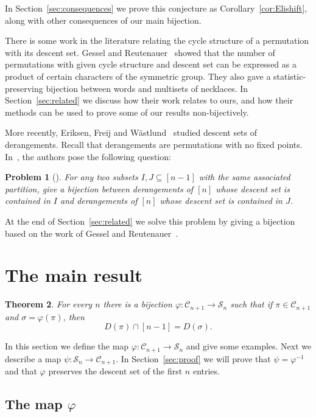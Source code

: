 \documentclass[11pt]{amsart}
\newtheorem{theorem}{Theorem}[section]
\newtheorem{prob}[theorem]{Problem}
\renewcommand\S{\mathcal S}
\newcommand\C{\mathcal C}
\newcommand\bij{\varphi}
\newcommand\inv{\psi}
\begin{document}
In Section~\ref{sec:consequences} we prove this conjecture as Corollary~\ref{cor:Elishift}, along with other consequences of our main bijection.

There is some work in the literature relating the cycle structure of a permutation with its descent set.
Gessel and Reutenauer~\cite{GR} showed that the number of permutations with given cycle structure and descent set can be expressed as a product of certain characters of the symmetric group.
They also gave a statistic-preserving bijection between words and multisets of necklaces. In Section~\ref{sec:related} we discuss how their work relates to ours, and how their methods can be used to prove some of our results non-bijectively.

More recently, Eriksen, Freij and W\"astlund~\cite{EFW} studied descent sets of derangements. Recall that derangements are permutations with no fixed points.
In~\cite[Problem~9.3]{EFW}, the authors pose the following question:

\begin{prob}[\cite{EFW}]\label{prob:EFW} For any two subsets $I,J\subseteq[n-1]$ with the same associated partition, give a bijection between derangements of $[n]$ whose descent
set is contained in $I$ and derangements of $[n]$ whose descent set is contained in $J$.
\end{prob}

At the end of Section~\ref{sec:related} we solve this problem by giving a bijection based on the work of Gessel and Reutenauer~\cite{GR}.

\section{The main result}\label{sec:main}

\begin{theorem}\label{thm:bij} For every $n$ there is a bijection $\bij:\C_{n+1}\rightarrow\S_n$ such that if $\pi\in\C_{n+1}$ and $\sigma=\bij(\pi)$, then
$$D(\pi)\cap[n-1]=D(\sigma).$$
\end{theorem}

In this section we define the map $\bij:\C_{n+1}\rightarrow\S_n$ and give some examples. Next we describe a map $\inv:\S_n\rightarrow\C_{n+1}$. In Section~\ref{sec:proof} we will
prove that $\inv=\bij^{-1}$ and that $\bij$ preserves the descent set of the first $n$ entries.

\subsection{The map $\bij$}
\end{document}
